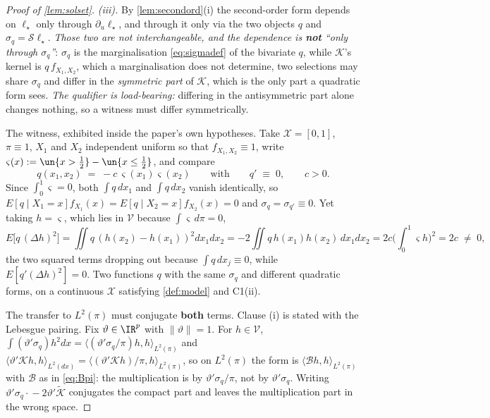 \begin{proof}[Proof of \cref{lem:solset}]
\emph{(iii).} By \cref{lem:secondord}(i) the second-order form depends on $\ell_\star$ only through
$\partial_u\ell_\star$, and through it only via the two objects $q$ and $\sigma_q=\mathcal S\ell_\star$.
\emph{Those two are not interchangeable, and the dependence is \textbf{not} ``only through $\sigma_q$''}:
$\sigma_q$ is the marginalisation \eqref{eq:sigmadef} of
the bivariate $q$, while $\mathcal K$'s kernel is $q\,f_{X_1,X_2}$, which a marginalisation does not
determine, two selections may share $\sigma_q$ and differ in the \emph{symmetric part} of $\mathcal K$,
which is the only part a quadratic form sees. \emph{The qualifier is load-bearing:} differing in the
antisymmetric part alone changes nothing, so a witness must differ symmetrically.

The witness, exhibited inside the paper's own hypotheses. Take
$\mathcal X=[0,1]$, $\pi\equiv1$, $X_1$ and $X_2$ independent uniform so that $f_{X_1,X_2}\equiv1$, write
$\varsigma(x):=\un\{x>\tfrac12\}-\un\{x\le\tfrac12\}$, and compare
\[
q(x_1,x_2)\;=\;-c\,\varsigma(x_1)\varsigma(x_2)
\qquad\text{with}\qquad
q'\;\equiv\;0,\qquad c>0 .
\]
Since $\int_0^1\varsigma=0$, both $\int q\,dx_1$ and $\int q\,dx_2$ vanish identically, so
$E[q\mid X_1=x]f_{X_1}(x)=E[q\mid X_2=x]f_{X_2}(x)=0$ and $\sigma_q=\sigma_{q'}\equiv0$. Yet taking
$h=\varsigma$, which lies in $\mathcal V$ because $\int\varsigma\,d\pi=0$,
\[
E\big[q\,(\Delta h)^{2}\big]
=\iint q\,(h(x_2)-h(x_1))^{2}dx_1dx_2
=-2\iint q\,h(x_1)h(x_2)\,dx_1dx_2
=2c\Big(\int_0^1\varsigma h\Big)^{2}=2c\;\ne\;0,
\]
the two squared terms dropping out because $\int q\,dx_j\equiv0$, while $E[q'(\Delta h)^{2}]=0$.
Two functions $q$ with the same $\sigma_q$ and different quadratic forms, on a continuous
$\mathcal X$ satisfying \cref{def:model} and C1(ii).

The transfer to $L^{2}(\pi)$ must conjugate \textbf{both} terms. Clause (i) is stated with the
Lebesgue pairing. Fix $\vartheta\in\IR^{p}$ with
$\|\vartheta\|=1$. For $h\in\mathcal V$,
$\int(\vartheta'\sigma_q)h^{2}dx=\langle(\vartheta'\sigma_q/\pi)h,h\rangle_{L^{2}(\pi)}$ and
$\langle\vartheta'\mathcal Kh,h\rangle_{L^{2}(dx)}=\langle(\vartheta'\mathcal Kh)/\pi,h\rangle_{L^{2}(\pi)}$,
so on $L^{2}(\pi)$ the form is $\langle\mathcal Bh,h\rangle_{L^{2}(\pi)}$ with $\mathcal B$ as in
\eqref{eq:Bpi}: the multiplication is by $\vartheta'\sigma_q/\pi$, not by $\vartheta'\sigma_q$.
Writing $\vartheta'\sigma_q\cdot{}-2\vartheta'\tilde{\mathcal K}$ conjugates the compact part and leaves
the multiplication part in the wrong space.


\end{proof}
